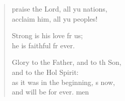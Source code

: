 \settowidth{\versewidth}{Glory to the Father, and to the Son, *}
\begin{verse}%
  \begin{patverse}
     praise the Lord, all yu nations,\Med\\
acclaim him, all yu peoples!

Strong is his love fr us;\Med\\
he is faithful fr ever.

Glory to the Father, and to th Son,\Med\\
and to the Hol Spirit:\\
as it was in the beginning, \pointup{\i}s now,\Med\\
and will be for ever. men
  \end{patverse}
\end{verse}
